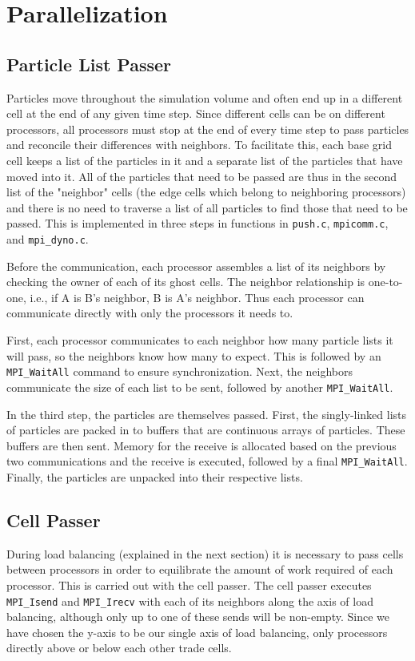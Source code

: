 \documentclass[]{article}
\begin{document}
\section{Parallelization}

\subsection{Particle List Passer}
Particles move throughout the simulation volume and often end up in a different cell at the end of any given time step.  Since different cells can be on different processors, all processors must stop at the end of every time step to pass particles and reconcile their differences with neighbors.  To facilitate this, each base grid cell keeps a list of the particles in it and a separate list of the particles that have moved into it.  All of the particles that need to be passed are thus in the second list of the "neighbor" cells (the edge cells which belong to neighboring processors) and there is no need to traverse a list of all particles to find those that need to be passed.  This is implemented in three steps in functions in \texttt{push.c}, \texttt{mpicomm.c}, and \texttt{mpi\_dyno.c}.

Before the communication, each processor assembles a list of its neighbors by checking the owner of each of its ghost cells.  The neighbor relationship is one-to-one, i.e., if A is B's neighbor, B is A's neighbor.  Thus each processor can communicate directly with only the processors it needs to.

First, each processor communicates to each neighbor how many particle lists it will pass, so the neighbors know how many to expect.  This is followed by an \texttt{MPI\_WaitAll} command to ensure synchronization.  Next, the neighbors communicate the size of each list to be sent, followed by another \texttt{MPI\_WaitAll}.

In the third step, the particles are themselves passed.  First, the singly-linked lists of particles are packed in to buffers that are continuous arrays of particles.  These buffers are then sent.  Memory for the receive is allocated based on the previous two communications and the receive is executed, followed by a final \texttt{MPI\_WaitAll}.  Finally, the particles are unpacked into their respective lists.

\subsection{Cell Passer}
During load balancing (explained in the next section) it is necessary to pass cells between processors in order to equilibrate the amount of work required of each processor. This is carried out with the cell passer. The cell passer executes \texttt{MPI\_Isend} and \texttt{MPI\_Irecv} with each of its neighbors along the axis of load balancing, although only up to one of these sends will be non-empty. Since we have chosen the y-axis to be our single axis of load balancing, only processors directly above or below each other trade cells. 
\end{document}
